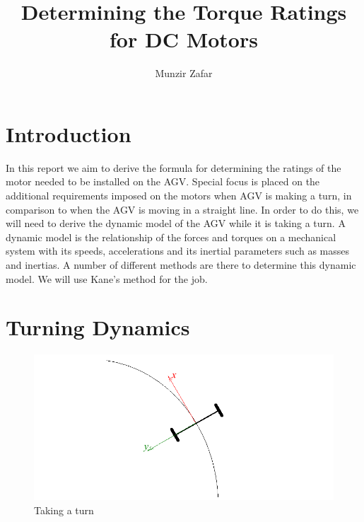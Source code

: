 \documentclass[a4paper,10pt]{article}
\title{Determining the Torque Ratings for DC Motors}
\author{Munzir Zafar}
\begin{document}
\maketitle

% 

\section{Introduction}

In this report we aim to derive the formula for determining the ratings of the motor needed to be installed on the AGV. 
Special focus is placed on the additional requirements imposed on the motors when AGV is making a turn, in comparison to
when the AGV is moving in a straight line. In order to do this, we will need to derive the dynamic model of the AGV
while it is taking a turn. A dynamic model is the relationship of the forces and torques on a mechanical system with
its speeds, accelerations and its inertial parameters such as masses and inertias. A number of different methods are 
there to determine this dynamic model. We will use Kane's method for the job. 

\section{Turning Dynamics}
\begin{figure}[!ht]
\centering \includegraphics[width=1.0\columnwidth]{Figures/fig2.png}
\caption{Taking a turn}
\label{fig:fig2} 
\end{figure}
\end{document}
